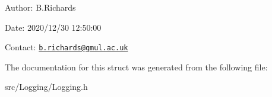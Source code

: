 \begin{DoxyParagraph}{Author\-:}
B.\-Richards 
\end{DoxyParagraph}
\begin{DoxyParagraph}{Date\-:}
2020/12/30 12\-:50\-:00 
\end{DoxyParagraph}
Contact\-: \href{mailto:b.richards@qmul.ac.uk}{\tt b.\-richards@qmul.\-ac.\-uk} 

The documentation for this struct was generated from the following file\-:\begin{DoxyCompactItemize}
\item 
src/\-Logging/Logging.\-h\end{DoxyCompactItemize}
